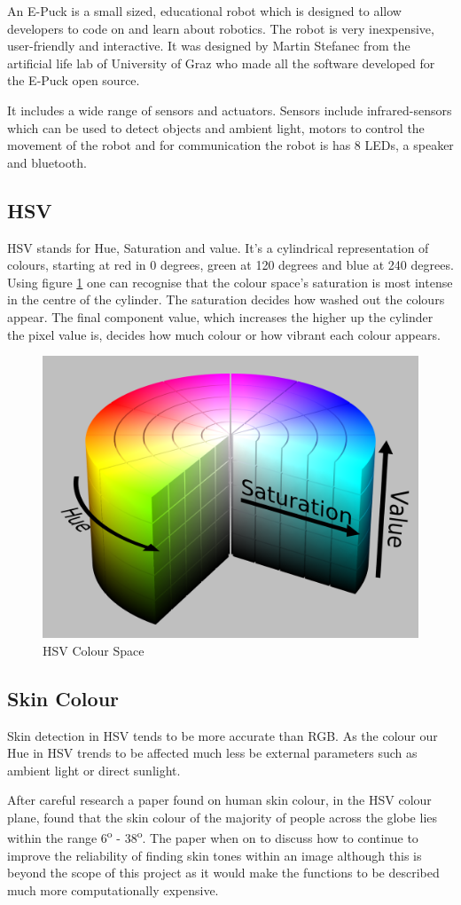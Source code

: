 An E-Puck\cite{epuck} is a small sized, educational robot which is designed to allow developers to code on and learn about robotics. The robot is very inexpensive, user-friendly and interactive. It was designed by Martin Stefanec from the artificial life lab of University of Graz who made all the software developed for the E-Puck open source.

It includes a wide range of sensors and actuators. Sensors include infrared-sensors which can be used to detect objects and ambient light, motors to control the movement of the robot and for communication the robot is has 8 LEDs, a speaker and bluetooth.

\subsection{HSV}

HSV stands for Hue, Saturation and value. It's a cylindrical representation of colours, starting at red in 0 degrees, green at 120 degrees and blue at 240 degrees. Using figure \ref{fig:hsv} one can recognise that the colour space's saturation is most intense in the centre of the cylinder. The saturation decides how washed out the colours appear. The final component value, which increases the higher up the cylinder the pixel value is, decides how much colour or how vibrant each colour appears.

\begin{figure}
	\centering
	\includegraphics[width=0.7\linewidth]{figures/hsv}
	\caption{HSV Colour Space}
	\label{fig:hsv}
\end{figure}


\subsection{Skin Colour}

Skin detection in HSV tends to be more accurate than RGB. As the colour our Hue in HSV trends to be affected much less be external parameters such as ambient light or direct sunlight.

After careful research a paper found on human skin colour\cite{skinDetection}, in the HSV colour plane, found that the skin colour of the majority of people across the globe lies within the range 6\textsuperscript{o} - 38\textsuperscript{o}. The paper when on to discuss how to continue to improve the reliability of finding skin tones within an image although this is beyond the scope of this project as it would make the functions to be described much more computationally expensive. 
 